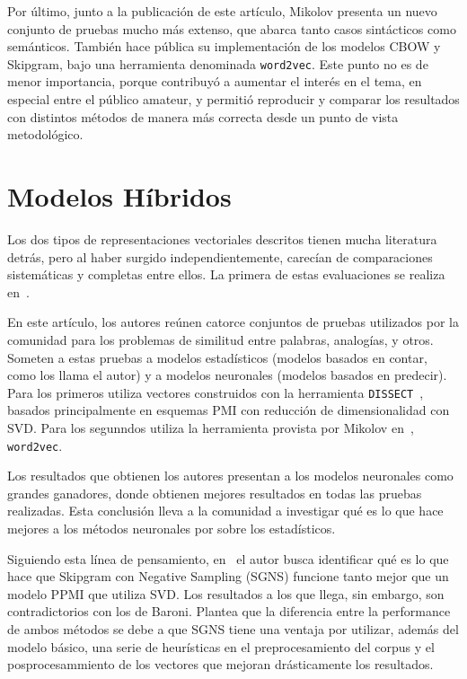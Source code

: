 Por último, junto a la publicación de este artículo, Mikolov presenta un nuevo conjunto de pruebas
mucho más extenso, que abarca tanto casos sintácticos como semánticos. También hace pública su
implementación de los modelos CBOW y Skipgram, bajo una herramienta denominada
\texttt{word2vec}. Este punto no es de menor importancia, porque contribuyó a aumentar el interés en
el tema, en especial entre el público amateur, y permitió reproducir y comparar los resultados con
distintos métodos de manera más correcta desde un punto de vista metodológico.


\section{Modelos Híbridos}

Los dos tipos de representaciones vectoriales descritos tienen mucha literatura detrás, pero al
haber surgido independientemente, carecían de comparaciones sistemáticas y completas entre ellos. La
primera de estas evaluaciones se realiza en~\cite{Baroni2014}.

En este artículo, los autores reúnen catorce conjuntos de pruebas utilizados por la comunidad para
los problemas de similitud entre palabras, analogías, y otros. Someten a estas pruebas a modelos
estadísticos (modelos basados en contar, como los llama el autor) y a modelos neuronales (modelos
basados en predecir). Para los primeros utiliza vectores construidos con la herramienta
\texttt{DISSECT}~\cite{Dinu2013}, basados principalmente en esquemas PMI con reducción de
dimensionalidad con SVD\@. Para los segunndos utiliza la herramienta provista por Mikolov
en~\cite{Mikolov2013c}, \texttt{word2vec}.

Los resultados que obtienen los autores presentan a los modelos neuronales como grandes ganadores,
donde obtienen mejores resultados en todas las pruebas realizadas. Esta conclusión lleva a la
comunidad a investigar qué es lo que hace mejores a los métodos neuronales por sobre los
estadísticos.

Siguiendo esta línea de pensamiento, en~\cite{Levy2015} el autor busca identificar qué es lo que
hace que Skipgram con Negative Sampling (SGNS) funcione tanto mejor que un modelo PPMI que utiliza
SVD\@. Los resultados a los que llega, sin embargo, son contradictorios con los de Baroni. Plantea
que la diferencia entre la performance de ambos métodos se debe a que SGNS tiene una ventaja por
utilizar, además del modelo básico, una serie de heurísticas en el preprocesamiento del corpus y el
posprocesammiento de los vectores que mejoran drásticamente los resultados.

